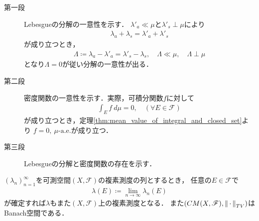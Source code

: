 	\begin{prf}\mbox{}
		\begin{description}
			\item[第一段] Lebesgueの分解の一意性を示す．
				$\lambda'_a \ll \mu$と$\lambda'_s \perp \mu$により
				\begin{align}
					\lambda_a + \lambda_s = \lambda'_a + \lambda'_s
				\end{align}
				が成り立つとき，
				\begin{align}
					\Lambda \coloneqq \lambda_a - \lambda'_a = \lambda'_s - \lambda_s,
					\quad \Lambda \ll \mu,
					\quad \Lambda \perp \mu
				\end{align}
				となり$\Lambda = 0$が従い分解の一意性が出る．
			
			\item[第二段] 密度関数の一意性を示す．実際，可積分関数$f$に対して
				\begin{align}
					\int_E f\ d\mu = 0, \quad (\forall E \in \mathscr{F})
				\end{align}
				が成り立つとき，定理\ref{thm:mean_value_of_integral_and_closed_set}より
				$f = 0,\ \mbox{$\mu$-a.e.}$が成り立つ．
				
			\item[第三段] Lebesgueの分解と密度関数の存在を示す．
				
		\end{description}
	\end{prf}
	
	\begin{screen}
		\begin{thm}\label{thm;Vitali_Hahn_Saks}
			$(\lambda_n)_{n=1}^\infty$を可測空間$(X,\mathscr{F})$の複素測度の列とするとき，
			任意の$E \in \mathscr{F}$で
			\begin{align}
				\lambda(E) \coloneqq \lim_{n \to \infty} \lambda_n(E)
				\label{eq:thm_Vitali_Hahn_Saks}
			\end{align}
			が確定すれば$\lambda$もまた$(X,\mathscr{F})$上の複素測度となる．
			また$(CM(X,\mathscr{F}),\left\|\, \cdot\, \right\|_{TV})$はBanach空間である．
		\end{thm}
	\end{screen}
	
